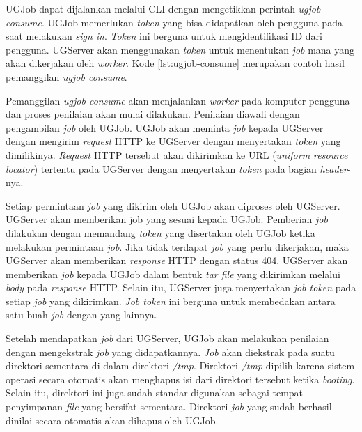 \par UGJob dapat dijalankan melalui CLI dengan mengetikkan perintah \textit{ugjob consume}. UGJob memerlukan \textit{token} yang bisa didapatkan oleh pengguna pada saat melakukan \textit{sign in}. \textit{Token} ini berguna untuk mengidentifikasi ID dari pengguna. UGServer akan menggunakan \textit{token} untuk menentukan \textit{job} mana yang akan dikerjakan oleh \textit{worker}. Kode \ref{lst:ugjob-consume} merupakan contoh hasil pemanggilan \textit{ugjob consume}.

\par Pemanggilan \textit{ugjob consume} akan menjalankan \textit{worker} pada komputer pengguna dan proses penilaian akan mulai dilakukan. Penilaian diawali dengan pengambilan \textit{job} oleh UGJob. UGJob akan meminta \textit{job} kepada UGServer dengan mengirim \textit{request} HTTP ke UGServer dengan menyertakan \textit{token} yang dimilikinya. \textit{Request} HTTP tersebut akan dikirimkan ke URL (\textit{uniform resource locator}) tertentu pada UGServer dengan menyertakan \textit{token} pada bagian \textit{header}-nya.

\par Setiap permintaan \textit{job} yang dikirim oleh UGJob akan diproses oleh UGServer. UGServer akan memberikan job yang sesuai kepada UGJob. Pemberian \textit{job} dilakukan dengan memandang \textit{token} yang disertakan oleh UGJob ketika melakukan permintaan \textit{job}. Jika tidak terdapat \textit{job} yang perlu dikerjakan, maka UGServer akan memberikan \textit{response} HTTP dengan status 404. UGServer akan memberikan \textit{job} kepada UGJob dalam bentuk \textit{tar file} yang dikirimkan melalui \textit{body} pada \textit{response} HTTP. Selain itu, UGServer juga menyertakan \textit{job token} pada setiap \textit{job} yang dikirimkan. \textit{Job token} ini berguna untuk membedakan antara satu buah \textit{job} dengan yang lainnya.

\par Setelah mendapatkan \textit{job} dari UGServer, UGJob akan melakukan penilaian dengan mengekstrak \textit{job} yang didapatkannya. \textit{Job} akan diekstrak pada suatu direktori sementara di dalam direktori \textit{/tmp}. Direktori \textit{/tmp} dipilih karena sistem operasi secara otomatis akan menghapus isi dari direktori tersebut ketika \textit{booting}. Selain itu, direktori ini juga sudah standar digunakan sebagai tempat penyimpanan \textit{file} yang bersifat sementara. Direktori \textit{job} yang sudah berhasil dinilai secara otomatis akan dihapus oleh UGJob. 

